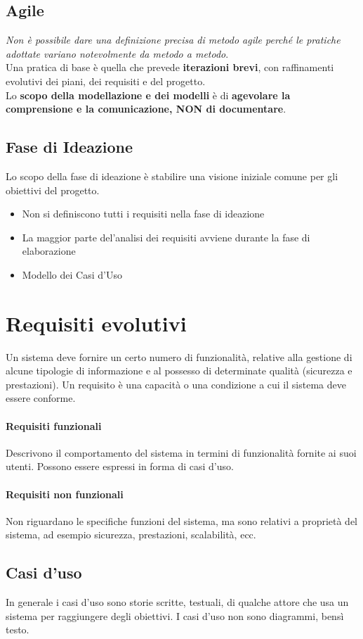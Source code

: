 \documentclass[12pt]{article}
\begin{document}
\subsection{Agile}
\textit{Non è possibile dare una definizione precisa di metodo agile perché le pratiche adottate variano notevolmente da metodo a metodo}. \\Una pratica di base è quella che prevede \textbf{iterazioni brevi}, con raffinamenti evolutivi dei piani, dei requisiti e del progetto. \\Lo \textbf{scopo della modellazione e dei modelli} è di \textbf{agevolare la comprensione e la comunicazione, NON di documentare}.
\subsection{Fase di Ideazione}
Lo scopo della fase di ideazione è stabilire una visione iniziale comune per gli obiettivi del progetto.
\begin{itemize}
    \item Non si definiscono tutti i requisiti nella fase di ideazione
    \item La maggior parte del'analisi dei requisiti avviene durante la fase di elaborazione
    \item Modello dei Casi d'Uso
\end{itemize}
\newpage
\section{Requisiti evolutivi}
Un sistema deve fornire un certo numero di funzionalità, relative alla gestione di alcune tipologie di informazione e al possesso di determinate qualità (sicurezza e prestazioni). Un requisito è una capacità o una condizione a cui il sistema deve essere conforme. 
\paragraph{Requisiti funzionali} Descrivono il comportamento del sistema in termini di funzionalità fornite ai suoi utenti. Possono essere espressi in forma di casi d'uso.
\paragraph{Requisiti non funzionali} Non riguardano le specifiche funzioni del sistema, ma sono relativi a proprietà del sistema, ad esempio sicurezza, prestazioni, scalabilità, ecc.
\subsection{Casi d'uso}
In generale i casi d'uso sono storie scritte, testuali, di qualche attore che usa un sistema per raggiungere degli obiettivi. I casi d'uso non sono diagrammi, bensì testo.
\end{document}
